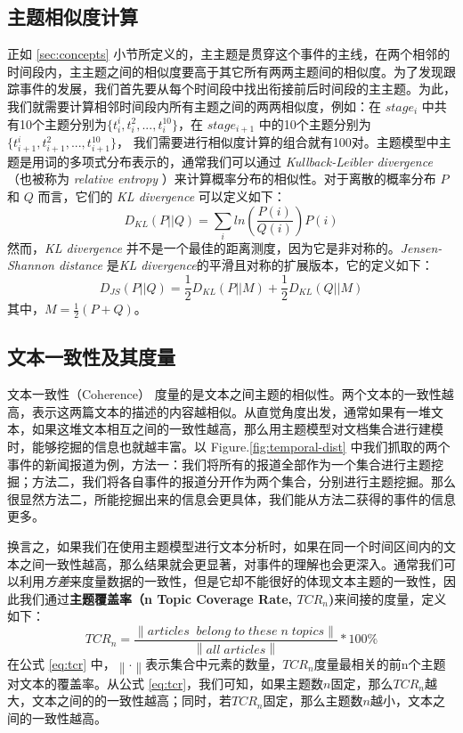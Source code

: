 \subsection{主题相似度计算}
\label{sec:similairty-calc}
正如 \ref{sec:concepts} 小节所定义的，主主题是贯穿这个事件的主线，在两个相邻的时间段内，主主题之间的相似度要高于其它所有两两主题间的相似度。为了发现跟踪事件的发展，我们首先要从每个时间段中找出衔接前后时间段的主主题。为此，我们就需要计算相邻时间段内所有主题之间的两两相似度，例如：在 $stage_i$ 中共有10个主题分别为$\{t_i^i, t_i^2, ..., t_i^{10}\}$，在 $stage_{i+1}$ 中的10个主题分别为 $\{t_{i+1}^i, t_{i+1}^2, ..., t_{i+1}^{10}\}$， 我们需要进行相似度计算的组合就有100对。主题模型中主题是用词的多项式分布表示的，通常我们可以通过 \emph{\emph{Kullback-Leibler divergence}}（也被称为 \emph{relative entropy} ）来计算概率分布的相似性。对于离散的概率分布 $P$ 和 $Q$ 而言，它们的 \emph{KL divergence}  可以定义如下：
\begin{equation}
D_{KL} \left ( P||Q \right ) = \sum_{i}ln\left ( \frac{P(i)}{Q(i)} \right ) P(i)
\end{equation}
然而，\emph{KL divergence} 并不是一个最佳的距离测度，因为它是非对称的。\emph{Jensen-Shannon distance} 是\emph{KL divergence}的平滑且对称的扩展版本，它的定义如下：
\begin{equation}
D_{JS} \left ( P||Q \right ) = \frac{1}{2} D_{KL} \left ( P||M \right ) + \frac{1}{2} D_{KL} \left ( Q||M \right )
\end{equation}
其中，$M = \frac{1}{2}(P+Q)$。

\subsection{文本一致性及其度量}
文本一致性（Coherence） 度量的是文本之间主题的相似性。两个文本的一致性越高，表示这两篇文本的描述的内容越相似。从直觉角度出发，通常如果有一堆文本，如果这堆文本相互之间的一致性越高，那么用主题模型对文档集合进行建模时，能够挖掘的信息也就越丰富。以 Figure.\ref{fig:temporal-dist} 中我们抓取的两个事件的新闻报道为例，方法一：我们将所有的报道全部作为一个集合进行主题挖掘；方法二，我们将各自事件的报道分开作为两个集合，分别进行主题挖掘。那么很显然方法二，所能挖掘出来的信息会更具体，我们能从方法二获得的事件的信息更多。

换言之，如果我们在使用主题模型进行文本分析时，如果在同一个时间区间内的文本之间一致性越高，那么结果就会更显著，对事件的理解也会更深入。通常我们可以利用\emph{方差}来度量数据的一致性，但是它却不能很好的体现文本主题的一致性，因此我们通过\textbf{主题覆盖率（n Topic Coverage Rate, $TCR_n$)}来间接的度量，定义如下：
\begin{equation}
\label{eq:tcr}
TCR_n = \frac{\left \| articles\;\;belong\;to\;these\;n\;topics \right \|}{\left \| all\;articles \right \|} * 100\%
\end{equation}
在公式 \ref{eq:tcr} 中，$\left \| \cdot \right \|$表示集合中元素的数量，$TCR_n$度量最相关的前n个主题对文本的覆盖率。从公式 \ref{eq:tcr}，我们可知，如果主题数$n$固定，那么$TCR_n$越大，文本之间的的一致性越高；同时，若$TCR_n$固定，那么主题数$n$越小，文本之间的一致性越高。


